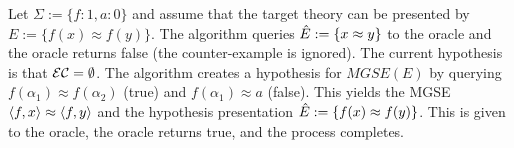 \begin{example}
Let $\Sigma := \{ f:1, a:0 \}$ and assume that the target theory can be presented by $E := \{ f(x)\approx f(y) \}$.
The algorithm queries $\ahat{E} := \{ x \approx y \}$ to the oracle and the oracle returns false (the counter-example is ignored).
The current hypothesis is that ${\mathcal{E}\mathcal{C}} = \emptyset$.
The algorithm creates a hypothesis for $MGSE(E)$ by querying $f(\alpha_1) \approx f(\alpha_2)$ (true) and $f(\alpha_1) \approx a$ (false). 
This yields the MGSE $\langle f, x \rangle \approx \langle f, y \rangle$ and the hypothesis presentation $\ahat{E} := \{ f(x) \approx f(y) \}$. 
This is given to the oracle, the oracle returns true, and the process completes.
\end{example}


